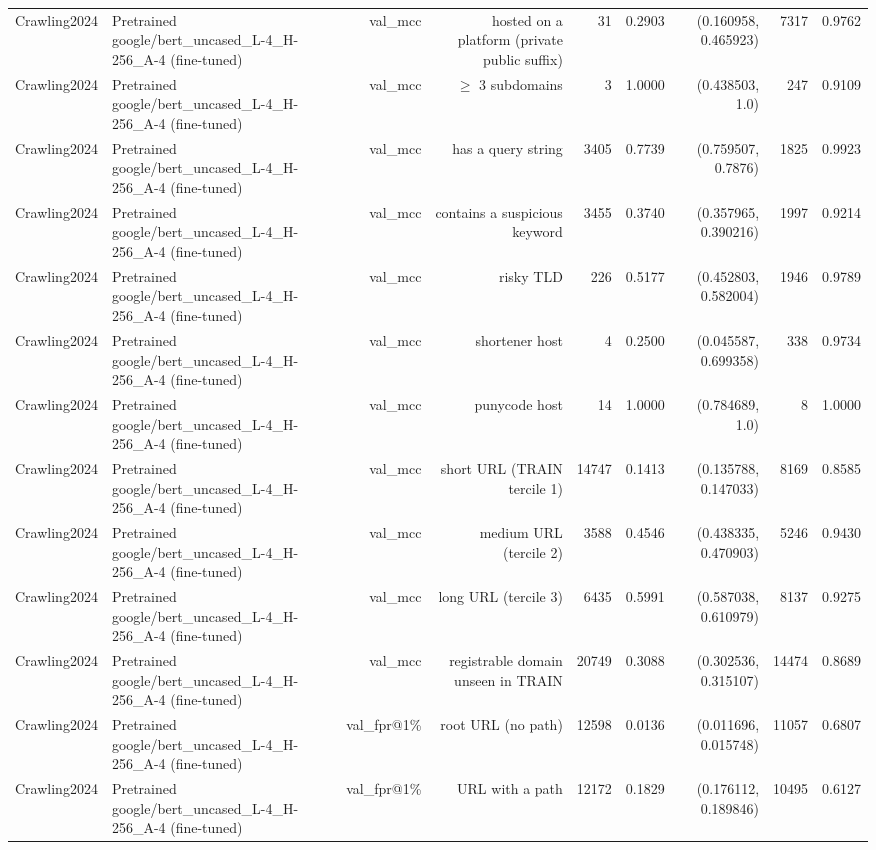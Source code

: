 \begin{table}[t]
\begin{tabular}{llrrrrrrr}
Crawling2024 & Pretrained google/bert\_uncased\_L-4\_H-256\_A-4 (fine-tuned) & val\_mcc & hosted on a platform (private public suffix) & 31 & 0.2903 & (0.160958, 0.465923) & 7317 & 0.9762 \\
Crawling2024 & Pretrained google/bert\_uncased\_L-4\_H-256\_A-4 (fine-tuned) & val\_mcc & $\geq$ 3 subdomains & 3 & 1.0000 & (0.438503, 1.0) & 247 & 0.9109 \\
Crawling2024 & Pretrained google/bert\_uncased\_L-4\_H-256\_A-4 (fine-tuned) & val\_mcc & has a query string & 3405 & 0.7739 & (0.759507, 0.7876) & 1825 & 0.9923 \\
Crawling2024 & Pretrained google/bert\_uncased\_L-4\_H-256\_A-4 (fine-tuned) & val\_mcc & contains a suspicious keyword & 3455 & 0.3740 & (0.357965, 0.390216) & 1997 & 0.9214 \\
Crawling2024 & Pretrained google/bert\_uncased\_L-4\_H-256\_A-4 (fine-tuned) & val\_mcc & risky TLD & 226 & 0.5177 & (0.452803, 0.582004) & 1946 & 0.9789 \\
Crawling2024 & Pretrained google/bert\_uncased\_L-4\_H-256\_A-4 (fine-tuned) & val\_mcc & shortener host & 4 & 0.2500 & (0.045587, 0.699358) & 338 & 0.9734 \\
Crawling2024 & Pretrained google/bert\_uncased\_L-4\_H-256\_A-4 (fine-tuned) & val\_mcc & punycode host & 14 & 1.0000 & (0.784689, 1.0) & 8 & 1.0000 \\
Crawling2024 & Pretrained google/bert\_uncased\_L-4\_H-256\_A-4 (fine-tuned) & val\_mcc & short URL (TRAIN tercile 1) & 14747 & 0.1413 & (0.135788, 0.147033) & 8169 & 0.8585 \\
Crawling2024 & Pretrained google/bert\_uncased\_L-4\_H-256\_A-4 (fine-tuned) & val\_mcc & medium URL (tercile 2) & 3588 & 0.4546 & (0.438335, 0.470903) & 5246 & 0.9430 \\
Crawling2024 & Pretrained google/bert\_uncased\_L-4\_H-256\_A-4 (fine-tuned) & val\_mcc & long URL (tercile 3) & 6435 & 0.5991 & (0.587038, 0.610979) & 8137 & 0.9275 \\
Crawling2024 & Pretrained google/bert\_uncased\_L-4\_H-256\_A-4 (fine-tuned) & val\_mcc & registrable domain unseen in TRAIN & 20749 & 0.3088 & (0.302536, 0.315107) & 14474 & 0.8689 \\
Crawling2024 & Pretrained google/bert\_uncased\_L-4\_H-256\_A-4 (fine-tuned) & val\_fpr@1\% & root URL (no path) & 12598 & 0.0136 & (0.011696, 0.015748) & 11057 & 0.6807 \\
Crawling2024 & Pretrained google/bert\_uncased\_L-4\_H-256\_A-4 (fine-tuned) & val\_fpr@1\% & URL with a path & 12172 & 0.1829 & (0.176112, 0.189846) & 10495 & 0.6127 \\

\end{tabular}
\end{table}
